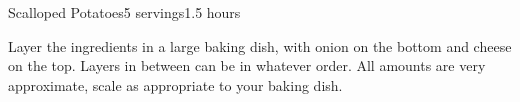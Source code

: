 \documentclass[../Cookbook.tex]{subfiles}
\begin{document}
\begin{recipe}[ScallopedPotatoes]{Scalloped Potatoes}{5 servings}{1.5 hours}

Layer the ingredients in a large baking dish, with onion on the bottom and cheese on the top.
Layers in between can be in whatever order.
All amounts are very approximate, scale as appropriate to your baking dish.

\end{recipe}
\end{document}
